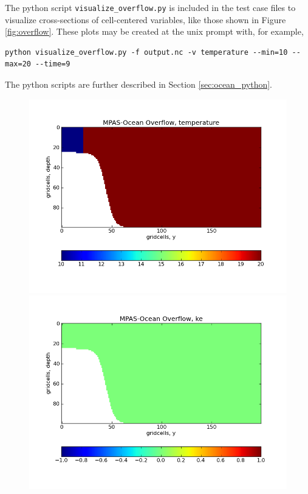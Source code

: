 The python script \verb|visualize_overflow.py| is included in the test case files to visualize cross-sections of cell-centered variables, like those shown in Figure \ref{fig:overflow}.  These plots may be created at the unix prompt with, for example,
\begin{verbatim}
python visualize_overflow.py -f output.nc -v temperature --min=10 --max=20 --time=9
\end{verbatim}
The python scripts are further described in Section \ref{sec:ocean_python}.

\begin{figure}[H]
	\centering
	\includegraphics[scale=0.4]{ocean/figures/MPAS-O_overflow_temperature_0hrs.png}
	\includegraphics[scale=0.4]{ocean/figures/MPAS-O_overflow_ke_0hrs.png}\\

\end{figure}
